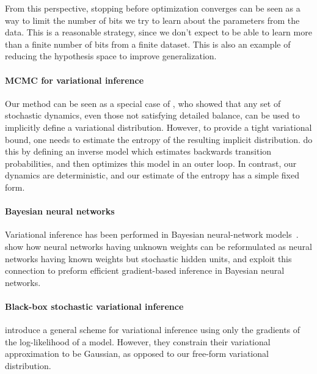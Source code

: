 \documentclass[]{article}
\begin{document}
From this perspective, stopping before optimization converges can be seen as a way to limit the number of bits we try to learn about the parameters from the data.
This is a reasonable strategy, since we don't expect to be able to learn more than a finite number of bits from a finite dataset.
This is also an example of reducing the hypothesis space to improve generalization.

\paragraph{MCMC for variational inference}
Our method can be seen as a special case of \citet{Bridging14}, who showed that any set of stochastic dynamics, even those not satisfying detailed balance, can be used to implicitly define a variational distribution.
However, to provide a tight variational bound, one needs to estimate the entropy of the resulting implicit distribution.
\citet{Bridging14} do this by defining an inverse model which estimates backwards transition probabilities, and then optimizes this model in an outer loop.
In contrast, our dynamics are deterministic, and our estimate of the entropy has a simple fixed form.

\paragraph{Bayesian neural networks}
Variational inference has been performed in Bayesian neural-network models~\citep{graves2011practical, deepGPVar14, Miguel2015pbp}.
\citet{kingma2014efficient} show how neural networks having unknown weights can be reformulated as neural networks having known weights but stochastic hidden units, and exploit this connection to preform efficient gradient-based inference in Bayesian neural networks.

\paragraph{Black-box stochastic variational inference}
\citet{alp2014blackbox} introduce a general scheme for variational inference using only the gradients of the log-likelihood of a model.
However, they constrain their variational approximation to be Gaussian, as opposed to our free-form variational distribution.

\end{document}
